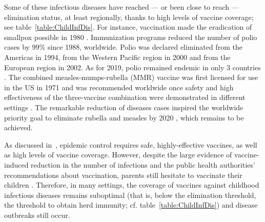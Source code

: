 Some of these infectious diseases have reached --- or been close to reach --- elimination status, at least regionally, thanks to high levels of vaccine coverage; see table~\ref{table:ChildInfDis}. For instance, vaccination made the eradication of smallpox possible in 1980 \cite[]{WHO_SmallpoxEradication1980,CDC_Smallpox2001}. Immunization programs reduced the number of polio cases by 99\% since 1988, worldwide. Polio was declared eliminated from the Americas in 1994, from the Western Pacific region in 2000 and from the European region in 2002. As for 2019, polio remained endemic in only 3 countries \cite[]{WHO_Factsheet_Polio}. The combined measles-mumps-rubella (MMR) vaccine was first licensed for use in the US in 1971 and was recommended worldwide once safety and high effectiveness of the three-vaccine combination were demonstrated in different settings \cite[]{Strebel2013}. The remarkable reduction of diseases cases inspired the worldwide priority goal to eliminate rubella and measles by 2020 \cite[]{Andrus2011,WHO_MRPlan2012}, which remains to be achieved.

As discussed in~, epidemic control requires safe, highly-effective vaccines, as well as high levels of vaccine coverage. However, despite the large evidence of vaccine-induced reduction in the number of infections and the public health authorities' recommendations about vaccination, parents still hesitate to vaccinate their children \cite[]{Larson2016}. Therefore, in many settings, the coverage of vaccines against childhood infectious diseases remains suboptimal (that is, below the elimination threshold, the threshold to obtain herd immunity; cf. table~\ref{table:ChildInfDis}) and disease outbreaks still occur.

